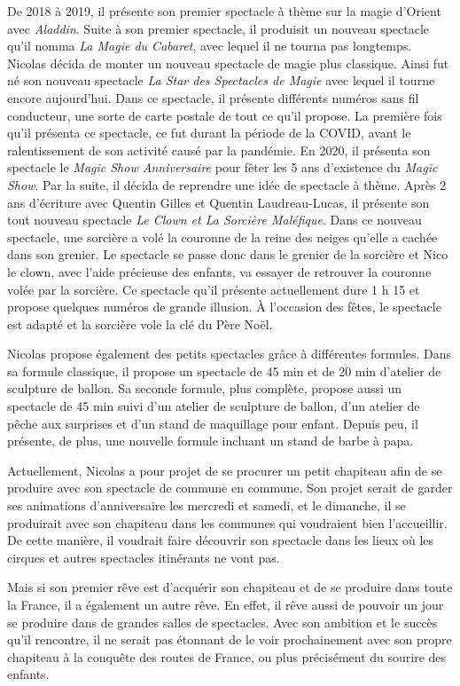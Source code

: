 De 2018 à 2019, il présente son premier spectacle à thème sur la magie d’Orient avec \textit{Aladdin}. Suite à son premier spectacle, il produisit un nouveau spectacle qu’il nomma \textit{La Magie du Cabaret}, avec lequel il ne tourna pas longtemps. Nicolas décida de monter un nouveau spectacle de magie plus classique. Ainsi fut né son nouveau spectacle \textit{La Star des Spectacles de Magie} avec lequel il tourne encore aujourd’hui. Dans ce spectacle, il présente différents numéros sans fil conducteur, une sorte de carte postale de tout ce qu’il propose. La première fois qu’il présenta ce spectacle, ce fut durant la période de la COVID, avant le ralentissement de son activité causé par la pandémie. En 2020, il présenta son spectacle le \textit{Magic Show Anniversaire} pour fêter les 5 ans d'existence du \textit{Magic Show}. Par la suite, il décida de reprendre une idée de spectacle à thème. Après 2 ans d’écriture avec Quentin Gilles et Quentin Laudreau-Lucas, il présente son tout nouveau spectacle \textit{Le Clown et La Sorcière Maléfique}. Dans ce nouveau spectacle, une sorcière a volé la couronne de la reine des neiges qu’elle a cachée dans son grenier. Le spectacle se passe donc dans le grenier de la sorcière et Nico le clown, avec l’aide précieuse des enfants, va essayer de retrouver la couronne volée par la sorcière. Ce spectacle qu’il présente actuellement dure 1 h 15 et propose quelques numéros de grande illusion. À l’occasion des fêtes, le spectacle est adapté et la sorcière vole la clé du Père Noël.  

Nicolas propose également des petits spectacles grâce à différentes formules. Dans sa formule classique, il propose un spectacle de 45 min et de 20 min d’atelier de sculpture de ballon. Sa seconde formule, plus complète, propose aussi un spectacle de 45 min suivi d’un atelier de sculpture de ballon, d’un atelier de pêche aux surprises et d’un stand de maquillage pour enfant. Depuis peu, il présente, de plus, une nouvelle formule incluant un stand de barbe à papa.  

Actuellement, Nicolas a pour projet de se procurer un petit chapiteau afin de se produire avec son spectacle de commune en commune. Son projet serait de garder ses animations d’anniversaire les mercredi et samedi, et le dimanche, il se produirait avec son chapiteau dans les communes qui voudraient bien l’accueillir. De cette manière, il voudrait faire découvrir son spectacle dans les lieux où les cirques et autres spectacles itinérants ne vont pas. 

Mais si son premier rêve est d’acquérir son chapiteau et de se produire dans toute la France, il a également un autre rêve. En effet, il rêve aussi de pouvoir un jour se produire dans de grandes salles de spectacles. Avec son ambition et le succès qu’il rencontre, il ne serait pas étonnant de le voir prochainement avec son propre chapiteau à la conquête des routes de France, ou plus précisément du sourire des enfants. 

